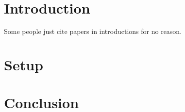 \section{Introduction}
Some people just cite papers in introductions for no reason.

\section{Setup}

\section{Conclusion}
